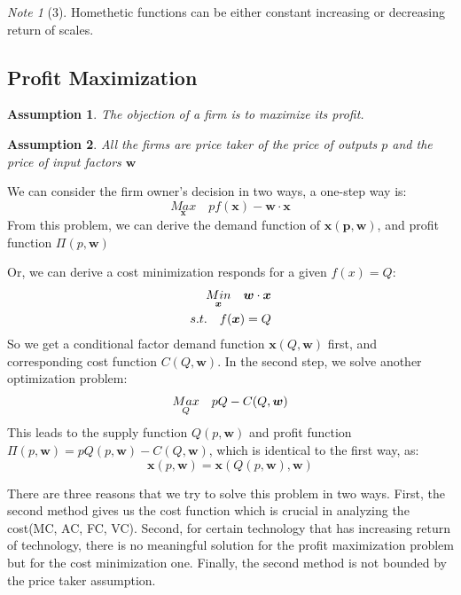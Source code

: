 \documentclass{article}
\theoremstyle{plain}
\newtheorem{asm}{Assumption}[section]
\theoremstyle{definition}
\theoremstyle{remark}
\newtheorem*{note}{Note}
\begin{document}
\begin{note}[3]
Homethetic functions can be either constant increasing or decreasing return of scales.
\end{note}


\subsection{Profit Maximization}
\begin{asm}
	The objection of a firm is to maximize its profit.
\end{asm}
\begin{asm}
	All the firms are price taker of the price of outputs $p$ and the price of input factors $\bm{w}$
\end{asm}

We can consider the firm owner's decision in two ways, a one-step way is:
\begin{equation}
	\underset{\bm{x}}{Max}\quad p f(\bm{x}) - \bm{w}\cdot\bm{x}
\end{equation}
From this problem, we can derive the demand function of $\bm{x(p,\bm{w})}$, and profit function $\Pi(p, \bm{w})$

Or, we can derive a cost minimization responds for a given $f(x) = Q$:
\begin{align} \notag
	\underset{\bm{x}}{Min}\quad \bm{w}\cdot\bm{x}\\ \notag
	s.t. \quad f(\bm{x})=Q
\end{align}
So we get a conditional factor demand function $\bm{x}(Q, \bm{w})$ first, and corresponding cost function $C(Q, \bm{w})$. In the second step, we solve another optimization problem:
\begin{align} \notag
	\underset{Q}{Max}\quad pQ - C(Q, \bm{w})
\end{align}
This leads to the supply function $Q(p, \bm{w})$ and profit function $\Pi(p,\bm{w}) = pQ(p, \bm{w}) - C(Q, \bm{w})$, which is identical to the first way, as:
\begin{equation}
	\bm{x}(p,\bm{w}) = \bm{x}(Q(p,\bm{w}), \bm{w})
\end{equation}

There are three reasons that we try to solve this problem in two ways. First, the second method gives us the cost function which is crucial in analyzing the cost(MC, AC, FC, VC). Second, for certain technology that has increasing return of technology, there is no meaningful solution for the profit maximization problem but for the cost minimization one. Finally, the second method is not bounded by the price taker assumption.
\end{document}
